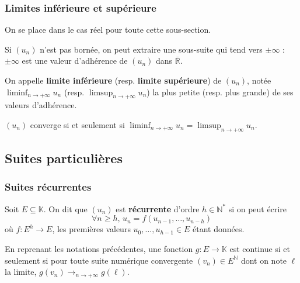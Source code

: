   \subsubsection{Limites inférieure et supérieure}


  On se place dans le cas réel pour toute cette sous-section.

  \begin{lemma}
    Si $(u_n)$ n'est pas bornée, on peut extraire une sous-suite qui tend vers $\pm \infty$ : $\pm \infty$ est une valeur d'adhérence de $(u_n)$ dans $\overline{\mathbb{R}}$.
  \end{lemma}

  \begin{definition}
    On appelle \textbf{limite inférieure} (resp. \textbf{limite supérieure}) de $(u_n)$, notée $\liminf_{n \rightarrow +\infty} u_n$ (resp. $\limsup_{n \rightarrow +\infty} u_n$) la plus petite (resp. plus grande) de ses valeurs d'adhérence.
  \end{definition}


  \begin{proposition}
    $(u_n)$ converge si et seulement si $\liminf_{n \rightarrow +\infty} u_n = \limsup_{n \rightarrow +\infty} u_n$.
  \end{proposition}

  \subsection{Suites particulières}

  \subsubsection{Suites récurrentes}


  \begin{definition}
    Soit $E \subseteq \mathbb{K}$. On dit que $(u_n)$ est \textbf{récurrente} d'ordre $h \in \mathbb{N}^*$ si on peut écrire
    \[ \forall n \geq h, \, u_n = f(u_{n-1}, \dots, u_{n-h}) \tag{$*$} \]
    où $f : E^h \rightarrow E$, les premières valeurs $u_0, \dots, u_{h-1} \in E$ étant données.
  \end{definition}


  \begin{theorem}
    En reprenant les notations précédentes, une fonction $g : E \rightarrow \mathbb{K}$ est continue si et seulement si pour toute suite numérique convergente $(v_n) \in E^{\mathbb{N}}$ dont on note $\ell$ la limite, $g(v_n) \longrightarrow_{n \rightarrow +\infty} g(\ell)$.
  \end{theorem}

